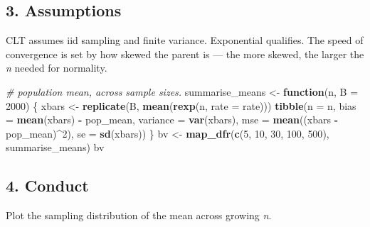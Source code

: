 \documentclass[
]{article}
\newenvironment{Shaded}{\begin{snugshade}}{\end{snugshade}}
\newcommand{\AttributeTok}[1]{\textcolor[rgb]{0.13,0.29,0.53}{#1}}
\newcommand{\CommentTok}[1]{\textcolor[rgb]{0.56,0.35,0.01}{\textit{#1}}}
\newcommand{\ControlFlowTok}[1]{\textcolor[rgb]{0.13,0.29,0.53}{\textbf{#1}}}
\newcommand{\DecValTok}[1]{\textcolor[rgb]{0.00,0.00,0.81}{#1}}
\newcommand{\FunctionTok}[1]{\textcolor[rgb]{0.13,0.29,0.53}{\textbf{#1}}}
\newcommand{\NormalTok}[1]{#1}
\newcommand{\OtherTok}[1]{\textcolor[rgb]{0.56,0.35,0.01}{#1}}
\newcommand{\SpecialCharTok}[1]{\textcolor[rgb]{0.81,0.36,0.00}{\textbf{#1}}}
\begin{document}
\subsection{3. Assumptions}\label{assumptions}

CLT assumes iid sampling and finite variance. Exponential qualifies. The
speed of convergence is set by how skewed the parent is --- the more
skewed, the larger the \emph{n} needed for normality.

\begin{Shaded}
\begin{Highlighting}[]
\CommentTok{\# population mean, across sample sizes.}
\NormalTok{summarise\_means }\OtherTok{\textless{}{-}} \ControlFlowTok{function}\NormalTok{(n, }\AttributeTok{B =} \DecValTok{2000}\NormalTok{) \{}
\NormalTok{  xbars }\OtherTok{\textless{}{-}} \FunctionTok{replicate}\NormalTok{(B, }\FunctionTok{mean}\NormalTok{(}\FunctionTok{rexp}\NormalTok{(n, }\AttributeTok{rate =}\NormalTok{ rate)))}
  \FunctionTok{tibble}\NormalTok{(}\AttributeTok{n =}\NormalTok{ n,}
         \AttributeTok{bias =} \FunctionTok{mean}\NormalTok{(xbars) }\SpecialCharTok{{-}}\NormalTok{ pop\_mean,}
         \AttributeTok{variance =} \FunctionTok{var}\NormalTok{(xbars),}
         \AttributeTok{mse =} \FunctionTok{mean}\NormalTok{((xbars }\SpecialCharTok{{-}}\NormalTok{ pop\_mean)}\SpecialCharTok{\^{}}\DecValTok{2}\NormalTok{),}
         \AttributeTok{se =} \FunctionTok{sd}\NormalTok{(xbars))}
\NormalTok{\}}
\NormalTok{bv }\OtherTok{\textless{}{-}} \FunctionTok{map\_dfr}\NormalTok{(}\FunctionTok{c}\NormalTok{(}\DecValTok{5}\NormalTok{, }\DecValTok{10}\NormalTok{, }\DecValTok{30}\NormalTok{, }\DecValTok{100}\NormalTok{, }\DecValTok{500}\NormalTok{), summarise\_means)}
\NormalTok{bv}
\end{Highlighting}
\end{Shaded}

\subsection{4. Conduct}\label{conduct}

Plot the sampling distribution of the mean across growing \emph{n}.
\end{document}
